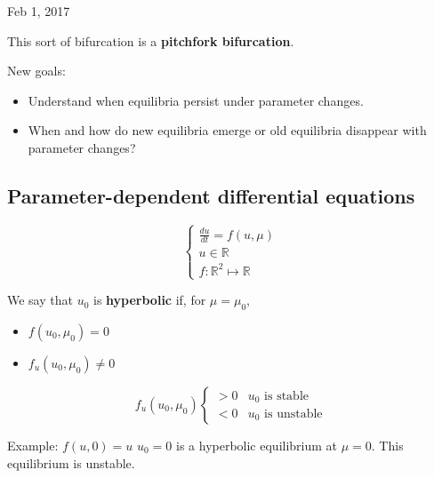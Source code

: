 \documentclass[main.tex]{subfiles}
\begin{document}
\hrulefill{}

Feb 1, 2017

\vspace{3mm}

This sort of bifurcation is a \textbf{pitchfork bifurcation}.

New goals:
\begin{itemize}
    \item Understand when equilibria persist under parameter changes.
    \item When and how do new equilibria emerge or old equilibria disappear with parameter changes?
\end{itemize}

\subsection{Parameter-dependent differential equations}

\begin{equation}
    \label{eq:2}
    \begin{cases}
        \frac{du}{dt} = f(u, \mu) \\
        u\in\mathbb{R} \\
        f: \mathbb{R}^2 \mapsto \mathbb{R}
    \end{cases}
\end{equation}

We say that $u_0$ is \textbf{hyperbolic} if, for $\mu = \mu_0$,
\begin{itemize}
    \item $f(u_0, \mu_0) = 0$
    \item $f_u(u_0, \mu_0) \neq 0$
\end{itemize}

$$f_u(u_0, \mu_0)\begin{cases}
    > 0 & u_0 \textrm{ is stable} \\
    < 0 & u_0 \textrm{ is unstable}
    \end{cases}$$

Example: $f(u, 0) = u$
$u_0 = 0$ is a hyperbolic equilibrium at $\mu = 0$. This equilibrium is unstable.
\end{document}
